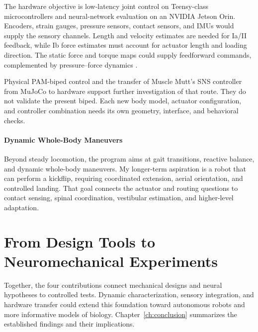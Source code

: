 The hardware objective is low-latency joint control on Teensy-class microcontrollers and neural-network evaluation on an NVIDIA Jetson Orin. Encoders, strain gauges, pressure sensors, contact sensors, and IMUs would supply the sensory channels. Length and velocity estimates are needed for Ia/II feedback, while Ib force estimates must account for actuator length and loading direction. The static force and torque maps could supply feedforward commands, complemented by pressure--force dynamics \citep{elzein_pressure_2025}.

Physical PAM-biped control \citep{li_controller_2024} and the transfer of Muscle Mutt's SNS controller from MuJoCo to hardware \citep{lutz_mechanical_2025} support further investigation of that route. They do not validate the present biped. Each new body model, actuator configuration, and controller combination needs its own geometry, interface, and behavioral checks.

\paragraph{Dynamic Whole-Body Maneuvers}\label{sec:fw_kickflip}

Beyond steady locomotion, the program aims at gait transitions, reactive balance, and dynamic whole-body maneuvers. My longer-term aspiration is a robot that can perform a kickflip, requiring coordinated extension, aerial orientation, and controlled landing. That goal connects the actuator and routing questions to contact sensing, spinal coordination, vestibular estimation, and higher-level adaptation.

\section{From Design Tools to Neuromechanical Experiments}

Together, the four contributions connect mechanical designs and neural hypotheses to controlled tests. Dynamic characterization, sensory integration, and hardware transfer could extend this foundation toward autonomous robots and more informative models of biology. Chapter~\ref{ch:conclusion} summarizes the established findings and their implications.

